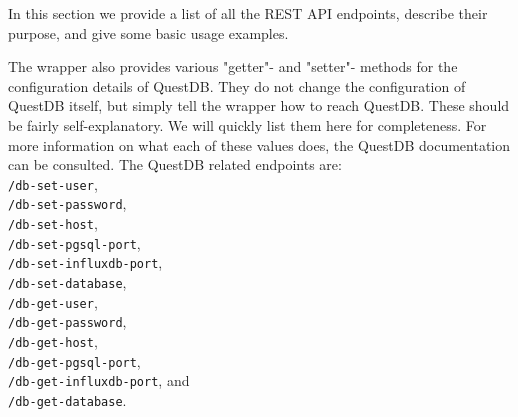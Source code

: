 In this section we provide a list of all the REST API endpoints, describe their purpose, and give some basic usage examples.



The wrapper also provides various "getter"- and "setter"- methods for the configuration details of QuestDB.
They do not change the configuration of QuestDB itself, but simply tell the wrapper how to reach QuestDB.
These should be fairly self-explanatory.
We will quickly list them here for completeness. 
For more information on what each of these values does, the QuestDB documentation \cite{questdb,questdb-postgres-wire,questdb-influx-db-line-protocol} can be consulted.
The QuestDB related endpoints are:\\
\texttt{/db-set-user}, \\
\texttt{/db-set-password}, \\
\texttt{/db-set-host}, \\
\texttt{/db-set-pgsql-port}, \\
\texttt{/db-set-influxdb-port}, \\
\texttt{/db-set-database}, \\
\texttt{/db-get-user}, \\
\texttt{/db-get-password}, \\
\texttt{/db-get-host}, \\
\texttt{/db-get-pgsql-port},\\
\texttt{/db-get-influxdb-port}, and \\
\texttt{/db-get-database}.






